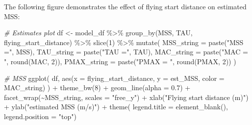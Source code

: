 \documentclass[fleqn,10pt,lineno]{wlpeerj} %
\newenvironment{Shaded}{\begin{snugshade}}{\end{snugshade}}
\newcommand{\AttributeTok}[1]{\textcolor[rgb]{0.77,0.63,0.00}{#1}}
\newcommand{\CommentTok}[1]{\textcolor[rgb]{0.56,0.35,0.01}{\textit{#1}}}
\newcommand{\DecValTok}[1]{\textcolor[rgb]{0.00,0.00,0.81}{#1}}
\newcommand{\FloatTok}[1]{\textcolor[rgb]{0.00,0.00,0.81}{#1}}
\newcommand{\FunctionTok}[1]{\textcolor[rgb]{0.00,0.00,0.00}{#1}}
\newcommand{\NormalTok}[1]{#1}
\newcommand{\OtherTok}[1]{\textcolor[rgb]{0.56,0.35,0.01}{#1}}
\newcommand{\SpecialCharTok}[1]{\textcolor[rgb]{0.00,0.00,0.00}{#1}}
\newcommand{\StringTok}[1]{\textcolor[rgb]{0.31,0.60,0.02}{#1}}
\begin{document}
The following figure demonstrates the effect of flying start distance on estimated MSS:

\begin{Shaded}
\begin{Highlighting}[]
\CommentTok{\# Estimates plot}
\NormalTok{df }\OtherTok{\textless{}{-}}\NormalTok{ model\_df }\SpecialCharTok{\%\textgreater{}\%}
  \FunctionTok{group\_by}\NormalTok{(MSS, TAU, flying\_start\_distance) }\SpecialCharTok{\%\textgreater{}\%}
  \FunctionTok{slice}\NormalTok{(}\DecValTok{1}\NormalTok{) }\SpecialCharTok{\%\textgreater{}\%}
  \FunctionTok{mutate}\NormalTok{(}
    \AttributeTok{MSS\_string =} \FunctionTok{paste}\NormalTok{(}\StringTok{"MSS ="}\NormalTok{, MSS),}
    \AttributeTok{TAU\_string =} \FunctionTok{paste}\NormalTok{(}\StringTok{"TAU ="}\NormalTok{, TAU),}
    \AttributeTok{MAC\_string =} \FunctionTok{paste}\NormalTok{(}\StringTok{"MAC = "}\NormalTok{, }\FunctionTok{round}\NormalTok{(MAC, }\DecValTok{2}\NormalTok{)),}
    \AttributeTok{PMAX\_string =} \FunctionTok{paste}\NormalTok{(}\StringTok{"PMAX = "}\NormalTok{, }\FunctionTok{round}\NormalTok{(PMAX, }\DecValTok{2}\NormalTok{))}
\NormalTok{  )}

\CommentTok{\# MSS}
\FunctionTok{ggplot}\NormalTok{(}
\NormalTok{  df,}
  \FunctionTok{aes}\NormalTok{(}\AttributeTok{x =}\NormalTok{ flying\_start\_distance, }\AttributeTok{y =}\NormalTok{ est\_MSS, }\AttributeTok{color =}\NormalTok{ MAC\_string)}
\NormalTok{) }\SpecialCharTok{+}
  \FunctionTok{theme\_bw}\NormalTok{(}\DecValTok{8}\NormalTok{) }\SpecialCharTok{+}
  \FunctionTok{geom\_line}\NormalTok{(}\AttributeTok{alpha =} \FloatTok{0.7}\NormalTok{) }\SpecialCharTok{+}
  \FunctionTok{facet\_wrap}\NormalTok{(}\SpecialCharTok{\textasciitilde{}}\NormalTok{MSS\_string, }\AttributeTok{scales =} \StringTok{"free\_y"}\NormalTok{) }\SpecialCharTok{+}
  \FunctionTok{xlab}\NormalTok{(}\StringTok{"Flying start distance (m)"}\NormalTok{) }\SpecialCharTok{+}
  \FunctionTok{ylab}\NormalTok{(}\StringTok{"estimated MSS (m/s)"}\NormalTok{) }\SpecialCharTok{+}
  \FunctionTok{theme}\NormalTok{(}
    \AttributeTok{legend.title =} \FunctionTok{element\_blank}\NormalTok{(), }
    \AttributeTok{legend.position =} \StringTok{"top"}\NormalTok{)}
\end{Highlighting}
\end{Shaded}
\end{document}
